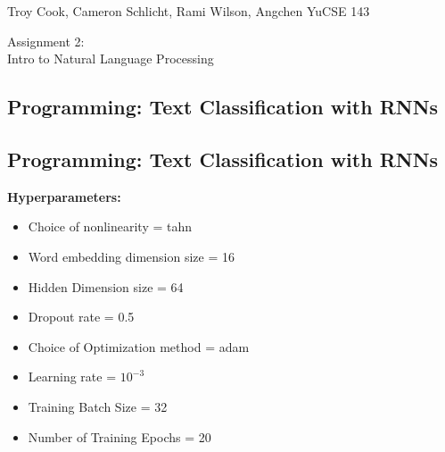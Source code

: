 \documentclass[12pt]{article}
\begin{document}
\noindent Troy Cook, Cameron Schlicht, Rami Wilson, Angchen Yu\hfill  CSE 143 

\begin{center}
  {\large Assignment 2:\\
  Intro to Natural Language Processing}
\end{center}


\begin{enumerate}


\section{Programming: Text Classification with RNNs}


\subsection{Programming: Text Classification with RNNs }


\textbf{Hyperparameters:}\\
\begin{itemize}
    \item Choice of nonlinearity = tahn\\
    \item Word embedding dimension size = 16\\
    \item Hidden Dimension size = 64\\
    \item Dropout rate = 0.5 \\
    \item Choice of Optimization method = adam\\
    \item Learning rate = $10^{-3}$\\
    \item Training Batch Size = 32\\
    \item Number of Training Epochs = 20\\\\\\\\\\\\\\\\\\\\\\\\\\\\\\\\\\\\\\\\\\\\\\
    

\end{itemize}
\end{enumerate}
\end{document}
